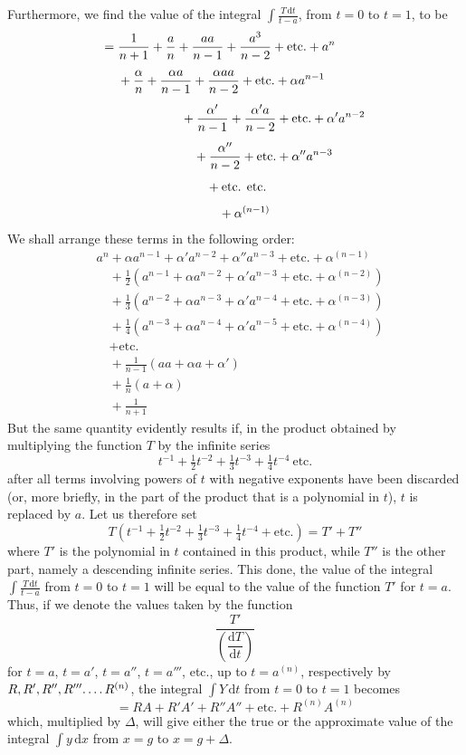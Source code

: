 Furthermore, we find the value of the integral $\int\frac{T\,\mathrm{d}t}{t-a}$, from $t=0$ to $t=1$, to be
\[
\begin{aligned}
={}&\frac{1}{n+1}+\frac{a}{n}+\frac{aa}{n-1}+\frac{a^3}{n-2}+\text{etc.}+a^n\\[4pt]
&+\frac{\alpha}{n}+\frac{\alpha a}{n-1}+\frac{\alpha aa}{n-2}+\text{etc.}+\alpha a^{n-1}\\[4pt]
&\hspace{5.01em}+\frac{\alpha'}{n-1}+\frac{\alpha'a}{n-2}+\text{etc.}+\alpha'a^{n-2}\\[4pt]
&\hspace{6.01em}+\frac{\alpha''}{n-2}+\text{etc.}+\alpha''a^{n-3}\\[4pt]
&\hspace{7.01em}+\text{etc. etc.}\\[4pt]
&\hspace{8.01em}+\alpha^{(n-1)}
\end{aligned}
\]
We shall arrange these terms in the following order:
\[
\begin{aligned}
&a^n+\alpha a^{n-1}+\alpha'a^{n-2}+\alpha''a^{n-3}+\text{etc.}+\alpha^{(n-1)}\\[4pt]
&\quad+\tfrac12(a^{n-1}+\alpha a^{n-2}+\alpha'a^{n-3}+\text{etc.}+\alpha^{(n-2)})\\[4pt]
&\quad+\tfrac13(a^{n-2}+\alpha a^{n-3}+\alpha'a^{n-4}+\text{etc.}+\alpha^{(n-3)})\\[4pt]
&\quad+\tfrac14(a^{n-3}+\alpha a^{n-4}+\alpha'a^{n-5}+\text{etc.}+\alpha^{(n-4)})\\[4pt]
&\quad+\text{etc.}\\[4pt]
&\quad+\frac{1}{n-1}(aa+\alpha a+\alpha')\\[4pt]
&\quad+\frac{1}{n}(a+\alpha)\\[4pt]
&\quad+\frac{1}{n+1}
\end{aligned}
\]
But the same quantity evidently results if, in the product obtained by multiplying the function $T$ by the infinite series
\[
t^{-1}+\tfrac12t^{-2}+\tfrac13t^{-3}+\tfrac14t^{-4}\ \text{etc.}
\]
after all terms involving powers of $t$ with negative exponents have been discarded (or, more briefly, in the part of the product that is a polynomial in $t$), $t$ is replaced by $a$. Let us therefore set
\[
T(t^{-1}+\tfrac12t^{-2}+\tfrac13t^{-3}+\tfrac14t^{-4}+\text{etc.})=T'+T''
\]
where $T'$ is the polynomial in $t$ contained in this product, while $T''$ is the other part, namely a descending infinite series. This done, the value of the integral $\int\frac{T\,\mathrm{d}t}{t-a}$ from $t=0$ to $t=1$ will be equal to the value of the function $T'$ for $t=a$. Thus, if we denote the values taken by the function
\[
\frac{T'}{\left(\dfrac{\mathrm{d}T}{\mathrm{d}t}\right)}
\]
for $t=a$, $t=a'$, $t=a''$, $t=a'''$, etc., up to $t=a^{(n)}$, respectively by $R,R',R'',R'''\ldotp\ldotp\ldotp\ldotp R^{(n)}$, the integral $\int Y\,\mathrm{d}t$ from $t=0$ to $t=1$ becomes
\[
=RA+R'A'+R''A''+\text{etc.}+R^{(n)}A^{(n)}
\]
which, multiplied by $\Delta$, will give either the true or the approximate value of the integral $\int y\,\mathrm{d}x$ from $x=g$ to $x=g+\Delta$.

